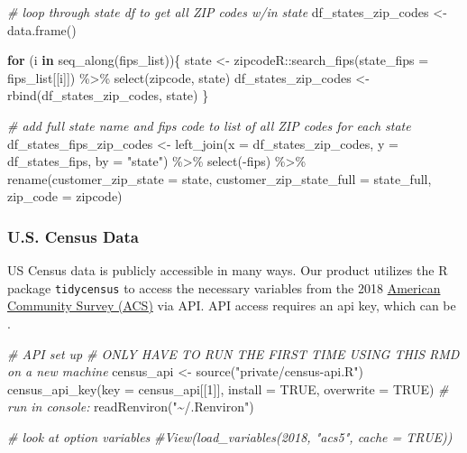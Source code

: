 \documentclass[
]{book}
\newenvironment{Shaded}{\begin{snugshade}}{\end{snugshade}}
\newcommand{\AttributeTok}[1]{\textcolor[rgb]{0.77,0.63,0.00}{#1}}
\newcommand{\CommentTok}[1]{\textcolor[rgb]{0.56,0.35,0.01}{\textit{#1}}}
\newcommand{\ConstantTok}[1]{\textcolor[rgb]{0.00,0.00,0.00}{#1}}
\newcommand{\ControlFlowTok}[1]{\textcolor[rgb]{0.13,0.29,0.53}{\textbf{#1}}}
\newcommand{\DecValTok}[1]{\textcolor[rgb]{0.00,0.00,0.81}{#1}}
\newcommand{\FunctionTok}[1]{\textcolor[rgb]{0.00,0.00,0.00}{#1}}
\newcommand{\NormalTok}[1]{#1}
\newcommand{\OtherTok}[1]{\textcolor[rgb]{0.56,0.35,0.01}{#1}}
\newcommand{\SpecialCharTok}[1]{\textcolor[rgb]{0.00,0.00,0.00}{#1}}
\newcommand{\StringTok}[1]{\textcolor[rgb]{0.31,0.60,0.02}{#1}}
\begin{document}
\begin{Shaded}
\begin{Highlighting}[]
\CommentTok{\# loop through state df to get all ZIP codes w/in state}
\NormalTok{df\_states\_zip\_codes }\OtherTok{\textless{}{-}} \FunctionTok{data.frame}\NormalTok{()}

\ControlFlowTok{for}\NormalTok{ (i }\ControlFlowTok{in} \FunctionTok{seq\_along}\NormalTok{(fips\_list))\{}
\NormalTok{  state }\OtherTok{\textless{}{-}}\NormalTok{ zipcodeR}\SpecialCharTok{::}\FunctionTok{search\_fips}\NormalTok{(}\AttributeTok{state\_fips =}\NormalTok{ fips\_list[[i]]) }\SpecialCharTok{\%\textgreater{}\%} 
    \FunctionTok{select}\NormalTok{(zipcode, state)}
\NormalTok{  df\_states\_zip\_codes }\OtherTok{\textless{}{-}} \FunctionTok{rbind}\NormalTok{(df\_states\_zip\_codes, state)}
\NormalTok{\}}

\CommentTok{\# add full state name and fips code to list of all ZIP codes for each state}
\NormalTok{df\_states\_fips\_zip\_codes }\OtherTok{\textless{}{-}} 
  \FunctionTok{left\_join}\NormalTok{(}\AttributeTok{x =}\NormalTok{ df\_states\_zip\_codes,}
            \AttributeTok{y =}\NormalTok{ df\_states\_fips,}
            \AttributeTok{by =} \StringTok{"state"}\NormalTok{) }\SpecialCharTok{\%\textgreater{}\%} 
  \FunctionTok{select}\NormalTok{(}\SpecialCharTok{{-}}\NormalTok{fips) }\SpecialCharTok{\%\textgreater{}\%} 
  \FunctionTok{rename}\NormalTok{(}\AttributeTok{customer\_zip\_state =}\NormalTok{ state,}
         \AttributeTok{customer\_zip\_state\_full =}\NormalTok{ state\_full,}
         \AttributeTok{zip\_code =}\NormalTok{ zipcode)}
\end{Highlighting}
\end{Shaded}

\hypertarget{u.s.-census-data}{%
\subsubsection{U.S. Census Data}\label{u.s.-census-data}}

US Census data is publicly accessible in many ways. Our product utilizes the R package \texttt{tidycensus} \citep{R-tidycensus} to access the necessary variables from the 2018 \href{https://www.census.gov/programs-surveys/acs/data.html}{American Community Survey (ACS)} via API. API access requires an api key, which can be .

\begin{Shaded}
\begin{Highlighting}[]
\CommentTok{\# API set up}
\CommentTok{\# ONLY HAVE TO RUN THE FIRST TIME USING THIS RMD on a new machine}
\NormalTok{census\_api }\OtherTok{\textless{}{-}} \FunctionTok{source}\NormalTok{(}\StringTok{"private/census{-}api.R"}\NormalTok{)}
\FunctionTok{census\_api\_key}\NormalTok{(}\AttributeTok{key =}\NormalTok{ census\_api[[}\DecValTok{1}\NormalTok{]], }\AttributeTok{install =} \ConstantTok{TRUE}\NormalTok{, }\AttributeTok{overwrite =} \ConstantTok{TRUE}\NormalTok{)}
\CommentTok{\# run in console:}
\FunctionTok{readRenviron}\NormalTok{(}\StringTok{"\textasciitilde{}/.Renviron"}\NormalTok{)}

\CommentTok{\# look at option variables}
\CommentTok{\#View(load\_variables(2018, "acs5", cache = TRUE))}
\end{Highlighting}
\end{Shaded}
\end{document}
